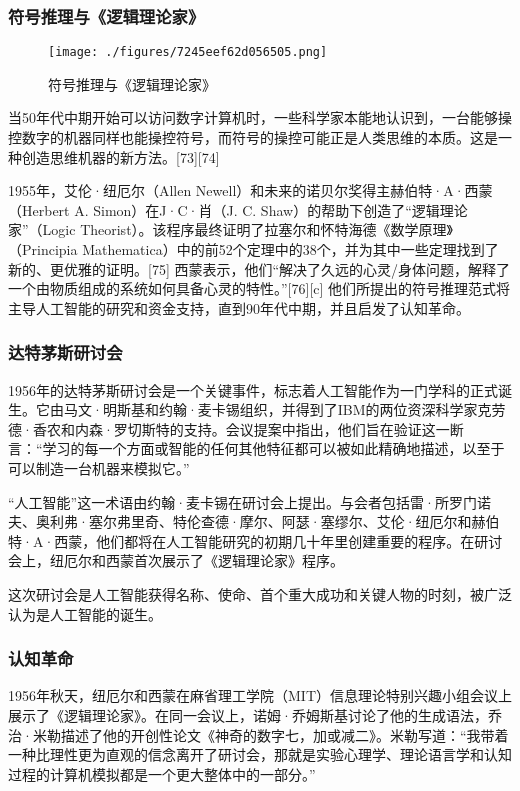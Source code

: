 \subsubsection{符号推理与《逻辑理论家》}
\begin{figure}[ht]
\centering
\texttt{[image: ./figures/7245eef62d056505.png]}
\caption{符号推理与《逻辑理论家》} \label{fig_RGZN_7}
\end{figure}
当50年代中期开始可以访问数字计算机时，一些科学家本能地认识到，一台能够操控数字的机器同样也能操控符号，而符号的操控可能正是人类思维的本质。这是一种创造思维机器的新方法。[73][74]

1955年，艾伦·纽厄尔（Allen Newell）和未来的诺贝尔奖得主赫伯特·A·西蒙（Herbert A. Simon）在J·C·肖（J. C. Shaw）的帮助下创造了“逻辑理论家”（Logic Theorist）。该程序最终证明了拉塞尔和怀特海德《数学原理》（Principia Mathematica）中的前52个定理中的38个，并为其中一些定理找到了新的、更优雅的证明。[75] 西蒙表示，他们“解决了久远的心灵/身体问题，解释了一个由物质组成的系统如何具备心灵的特性。”[76][c] 他们所提出的符号推理范式将主导人工智能的研究和资金支持，直到90年代中期，并且启发了认知革命。
\subsubsection{达特茅斯研讨会}  
1956年的达特茅斯研讨会是一个关键事件，标志着人工智能作为一门学科的正式诞生。它由马文·明斯基和约翰·麦卡锡组织，并得到了IBM的两位资深科学家克劳德·香农和内森·罗切斯特的支持。会议提案中指出，他们旨在验证这一断言：“学习的每一个方面或智能的任何其他特征都可以被如此精确地描述，以至于可以制造一台机器来模拟它。”  

“人工智能”这一术语由约翰·麦卡锡在研讨会上提出。与会者包括雷·所罗门诺夫、奥利弗·塞尔弗里奇、特伦查德·摩尔、阿瑟·塞缪尔、艾伦·纽厄尔和赫伯特·A·西蒙，他们都将在人工智能研究的初期几十年里创建重要的程序。在研讨会上，纽厄尔和西蒙首次展示了《逻辑理论家》程序。  

这次研讨会是人工智能获得名称、使命、首个重大成功和关键人物的时刻，被广泛认为是人工智能的诞生。
\subsubsection{认知革命}  
1956年秋天，纽厄尔和西蒙在麻省理工学院（MIT）信息理论特别兴趣小组会议上展示了《逻辑理论家》。在同一会议上，诺姆·乔姆斯基讨论了他的生成语法，乔治·米勒描述了他的开创性论文《神奇的数字七，加或减二》。米勒写道：“我带着一种比理性更为直观的信念离开了研讨会，那就是实验心理学、理论语言学和认知过程的计算机模拟都是一个更大整体中的一部分。”  

